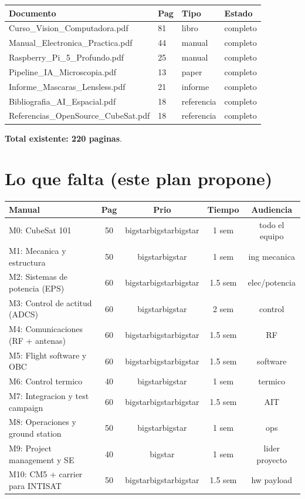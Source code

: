 \documentclass[11pt,a4paper,oneside]{report}
\begin{document}
\begin{center}
\begin{tabular}{p{4.5cm}p{1.5cm}p{2cm}p{5cm}}
\toprule
\textbf{Documento} & \textbf{Pag} & \textbf{Tipo} & \textbf{Estado} \\
\midrule
Curso\_Vision\_Computadora.pdf      & 81  & libro    & completo \\
Manual\_Electronica\_Practica.pdf   & 44  & manual   & completo \\
Raspberry\_Pi\_5\_Profundo.pdf      & 25  & manual   & completo \\
Pipeline\_IA\_Microscopia.pdf       & 13  & paper    & completo \\
Informe\_Mascaras\_Lensless.pdf     & 21  & informe  & completo \\
Bibliografia\_AI\_Espacial.pdf      & 18  & referencia & completo \\
Referencias\_OpenSource\_CubeSat.pdf & 18  & referencia & completo \\
\bottomrule
\end{tabular}
\end{center}

\textbf{Total existente: 220 paginas}.

\section{Lo que falta (este plan propone)}

\begin{center}
\begin{tabular}{lcccc}
\toprule
\textbf{Manual} & \textbf{Pag} & \textbf{Prio} & \textbf{Tiempo} & \textbf{Audiencia} \\
\midrule
M0: CubeSat 101                      & 50 & bigstarbigstarbigstar & 1 sem & todo el equipo \\
M1: Mecanica y estructura            & 50 & bigstarbigstar  & 1 sem & ing mecanica \\
M2: Sistemas de potencia (EPS)       & 60 & bigstarbigstarbigstar & 1.5 sem & elec/potencia \\
M3: Control de actitud (ADCS)        & 60 & bigstarbigstar  & 2 sem & control \\
M4: Comunicaciones (RF + antenas)    & 60 & bigstarbigstarbigstar & 1.5 sem & RF \\
M5: Flight software y OBC            & 60 & bigstarbigstarbigstar & 1.5 sem & software \\
M6: Control termico                  & 40 & bigstarbigstar  & 1 sem & termico \\
M7: Integracion y test campaign      & 60 & bigstarbigstarbigstar & 1.5 sem & AIT \\
M8: Operaciones y ground station     & 50 & bigstarbigstar  & 1 sem & ops \\
M9: Project management y SE          & 40 & bigstar   & 1 sem & lider proyecto \\
M10: CM5 + carrier para INTISAT      & 50 & bigstarbigstarbigstar & 1.5 sem & hw payload \\
\bottomrule
\end{tabular}
\end{center}
\end{document}
